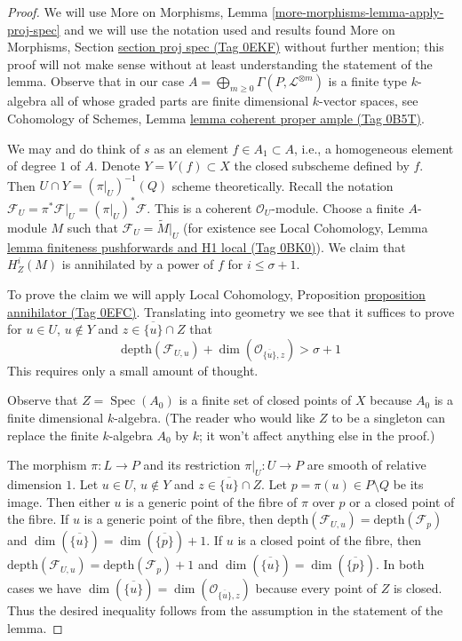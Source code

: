 \documentclass{amsart}
\theoremstyle{plain}
\theoremstyle{definition}
\theoremstyle{remark}
\numberwithin{equation}{subsection}
\def\Spec{\mathop{\mathrm{Spec}}}
\begin{document}
\begin{proof}
We will use More on Morphisms, Lemma \ref{more-morphisms-lemma-apply-proj-spec}
and we will use the notation used and results found
More on Morphisms, Section \href{https://stacks.math.columbia.edu/tag/0EKF}{section proj spec (Tag 0EKF)}
without further mention; this proof will not make sense without
at least understanding the statement of the lemma.
Observe that in our case
$A = \bigoplus_{m \geq 0} \Gamma(P, \mathcal{L}^{\otimes m})$
is a finite type $k$-algebra
all of whose graded parts are finite dimensional $k$-vector spaces, see
Cohomology of Schemes, Lemma \href{https://stacks.math.columbia.edu/tag/0B5T}{lemma coherent proper ample (Tag 0B5T)}.

\medskip\noindent
We may and do think of $s$ as an element $f \in A_1 \subset A$, i.e.,
a homogeneous element of degree $1$ of $A$. Denote
$Y = V(f) \subset X$ the closed subscheme defined by $f$.
Then $U \cap Y = (\pi|_U)^{-1}(Q)$ scheme theoretically.
Recall the notation
$\mathcal{F}_U = \pi^*\mathcal{F}|_U = (\pi|_U)^*\mathcal{F}$.
This is a coherent $\mathcal{O}_U$-module.
Choose a finite $A$-module $M$ such that
$\mathcal{F}_U = \widetilde{M}|_U$
(for existence see Local Cohomology, Lemma
\href{https://stacks.math.columbia.edu/tag/0BK0}{lemma finiteness pushforwards and H1 local (Tag 0BK0)}).
We claim that $H^i_Z(M)$ is annihilated by
a power of $f$ for $i \leq \sigma + 1$.

\medskip\noindent
To prove the claim we will apply
Local Cohomology, Proposition \href{https://stacks.math.columbia.edu/tag/0EFC}{proposition annihilator (Tag 0EFC)}.
Translating into geometry we see that it suffices to prove
for $u \in U$, $u \not \in Y$ and $z \in \overline{\{u\}} \cap Z$
that
$$
\text{depth}(\mathcal{F}_{U, u}) +
\dim(\mathcal{O}_{\overline{\{u\}}, z}) > \sigma + 1
$$
This requires only a small amount of thought.

\medskip\noindent
Observe that $Z = \Spec(A_0)$ is a finite set of closed points of $X$ because
$A_0$ is a finite dimensional $k$-algebra.
(The reader who would like $Z$ to be a singleton can replace the
finite $k$-algebra $A_0$ by $k$; it won't affect anything else in the proof.)

\medskip\noindent
The morphism $\pi : L \to P$ and its restriction $\pi|_U : U \to P$
are smooth of relative dimension $1$.
Let $u \in U$, $u \not \in Y$ and $z \in \overline{\{u\}} \cap Z$.
Let $p = \pi(u) \in P \setminus Q$ be its image.
Then either $u$ is a generic
point of the fibre of $\pi$ over $p$ or a closed point of the fibre.
If $u$ is a generic point of the fibre, then
$\text{depth}(\mathcal{F}_{U, u}) = \text{depth}(\mathcal{F}_p)$
and
$\dim(\overline{\{u\}}) = \dim(\overline{\{p\}}) + 1$.
If $u$ is a closed point of the fibre, then
$\text{depth}(\mathcal{F}_{U, u}) = \text{depth}(\mathcal{F}_p) + 1$
and
$\dim(\overline{\{u\}}) = \dim(\overline{\{p\}})$.
In both cases we have
$\dim(\overline{\{u\}}) = \dim(\mathcal{O}_{\overline{\{u\}}, z})$
because every point of $Z$ is closed. Thus the desired
inequality follows from the assumption in the statement of
the lemma.


\end{proof}
\end{document}
